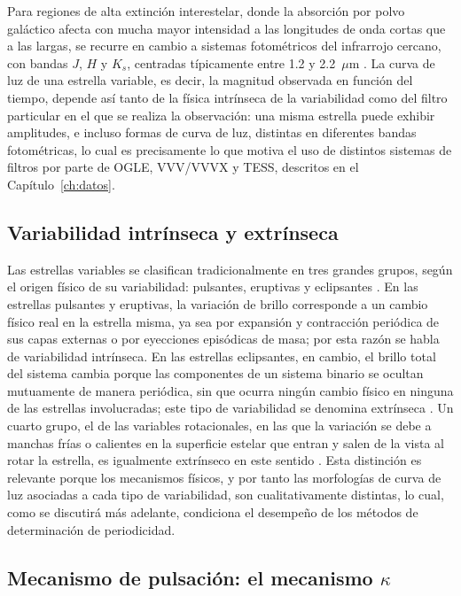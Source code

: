 \documentclass[12pt,letterpaper,oneside]{book}
\begin{document}
Para regiones de alta extinci\'on interestelar, donde la absorci\'on por polvo gal\'actico afecta con mucha mayor intensidad a las longitudes de onda cortas que a las largas, se recurre en cambio a sistemas fotom\'etricos del infrarrojo cercano, con bandas $J$, $H$ y $K_s$, centradas t\'ipicamente entre 1.2 y 2.2~$\mu$m \citep{Bessell2005}. La curva de luz de una estrella variable, es decir, la magnitud observada en funci\'on del tiempo, depende as\'i tanto de la f\'isica intr\'inseca de la variabilidad como del filtro particular en el que se realiza la observaci\'on: una misma estrella puede exhibir amplitudes, e incluso formas de curva de luz, distintas en diferentes bandas fotom\'etricas, lo cual es precisamente lo que motiva el uso de distintos sistemas de filtros por parte de OGLE, VVV/VVVX y TESS, descritos en el Cap\'itulo~\ref{ch:datos}.

\subsection{Variabilidad intr\'inseca y extr\'inseca}

Las estrellas variables se clasifican tradicionalmente en tres grandes grupos, seg\'un el origen f\'isico de su variabilidad: pulsantes, eruptivas y eclipsantes \citep{Karttunen2016}. En las estrellas pulsantes y eruptivas, la variaci\'on de brillo corresponde a un cambio f\'isico real en la estrella misma, ya sea por expansi\'on y contracci\'on peri\'odica de sus capas externas o por eyecciones episódicas de masa; por esta raz\'on se habla de variabilidad intr\'inseca. En las estrellas eclipsantes, en cambio, el brillo total del sistema cambia porque las componentes de un sistema binario se ocultan mutuamente de manera peri\'odica, sin que ocurra ning\'un cambio f\'isico en ninguna de las estrellas involucradas; este tipo de variabilidad se denomina extr\'inseca \citep{Karttunen2016}. Un cuarto grupo, el de las variables rotacionales, en las que la variaci\'on se debe a manchas fr\'ias o calientes en la superficie estelar que entran y salen de la vista al rotar la estrella, es igualmente extr\'inseco en este sentido \citep{Karttunen2016}. Esta distinci\'on es relevante porque los mecanismos f\'isicos, y por tanto las morfolog\'ias de curva de luz asociadas a cada tipo de variabilidad, son cualitativamente distintas, lo cual, como se discutir\'a m\'as adelante, condiciona el desempe\~no de los m\'etodos de determinaci\'on de periodicidad.

\subsection{Mecanismo de pulsaci\'on: el mecanismo $\kappa$}
\end{document}
